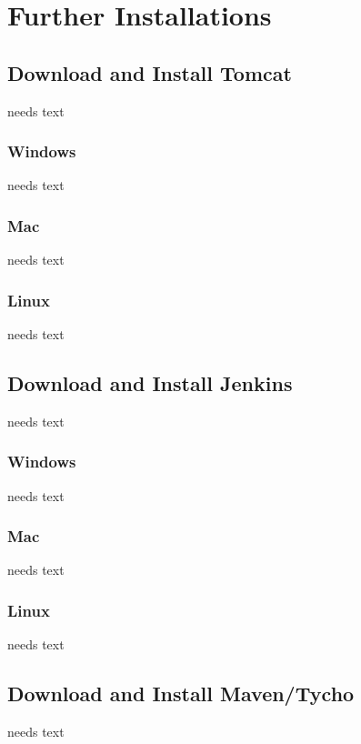 \documentclass[a4paper,10pt,twoside]{book}
\begin{document}
\chapter{Further Installations}

\section{Download and Install Tomcat}
needs text

\subsection{Windows}
needs text

\subsection{Mac}
needs text

\subsection{Linux}
needs text

\section{Download and Install Jenkins}
needs text

\subsection{Windows}
needs text

\subsection{Mac}
needs text

\subsection{Linux}
needs text

\section{Download and Install Maven/Tycho}
needs text
\end{document}
